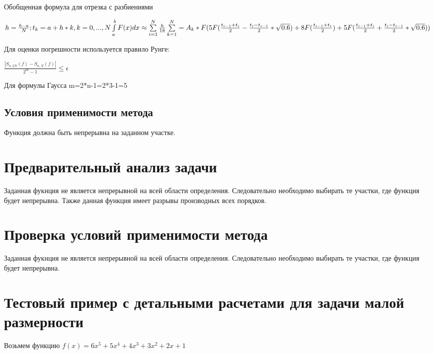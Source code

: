 Обобщенная формула для отрезка с разбиениями 

\begin{math} 
	h=\frac{b-a}{N}; t_{k}=a+h*k, k=0,...,N \\
	\int\limits_{a}^{b} F(x)dx \approx \sum\limits_{i=1}^{N} \frac{h}{18} \sum\limits_{k=1}^{N} = A_{k}*F(5F(\frac{t_{i-1}+t_{i}}{2}-\frac{t_{i}-t_{i-1}}{2}*\sqrt{0.6})+8F(\frac{t_{i-1}+t_{i}}{2}) +5F(\frac{t_{i-1}+t_{i}}{2}+\frac{t_{i}-t_{i-1}}{2}*\sqrt{0.6}))
\end{math}

Для оценки погрешности используется правило Рунге:

\begin{math} 
	\frac{|S_{n,2N}(f)-S_{n,N}(f)|}{2^{m}-1} \leq \epsilon
\end{math}

Для формулы Гаусса m=2*n-1=2*3-1=5

\subsection{Условия применимости метода}

Функция должна быть непрерывна на заданном участке.

\section{Предварительный анализ задачи}

Заданная фукнция не является непрерывной на всей области определения. Следовательно необходимо выбирать те участки, где функция будет непрерывна. Также данная функция имеет разрывы производных всех порядков. 

\section{Проверка условий применимости метода}

Заданная фукнция не является непрерывной на всей области определения. Следовательно необходимо выбирать те участки, где функция будет непрерывна. 

\section{Тестовый пример с детальными расчетами для задачи малой размерности}

Возьмем функцию \begin{math} 
	f(x)=6x^{5}+5x^{4}+4x^{3}+3x^{2}+2x+1
\end{math}

